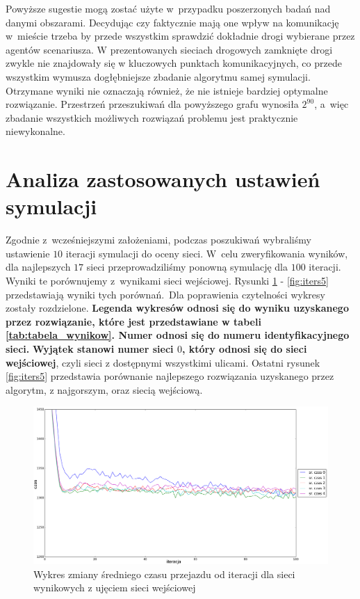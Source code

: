 \documentclass[twoside,12pt]{report}
\begin{document}
Powyższe sugestie mogą zostać użyte w~przypadku poszerzonych badań nad danymi obszarami. Decydując czy faktycznie mają one wpływ na komunikację w~mieście trzeba by przede wszystkim sprawdzić dokładnie drogi wybierane przez agentów scenariusza. W prezentowanych sieciach drogowych zamknięte drogi zwykle nie znajdowały się w kluczowych punktach komunikacyjnych, co przede wszystkim wymusza dogłębniejsze zbadanie algorytmu samej symulacji. Otrzymane wyniki nie oznaczają również, że nie istnieje bardziej optymalne rozwiązanie. Przestrzeń przeszukiwań dla powyższego grafu wynosiła $2^{90}$, a~więc zbadanie wszystkich możliwych rozwiązań problemu jest praktycznie niewykonalne.

\section{Analiza zastosowanych ustawień symulacji}

Zgodnie z~wcześniejszymi założeniami, podczas poszukiwań wybraliśmy ustawienie $10$ iteracji symulacji do oceny sieci. W~celu zweryfikowania wyników, dla najlepszych $17$ sieci przeprowadziliśmy ponowną symulację dla $100$ iteracji. Wyniki te porównujemy z~wynikami sieci wejściowej. Rysunki \ref{fig:iters1} - \ref{fig:iters5} przedstawiają wyniki tych porównań.~Dla poprawienia czytelności wykresy zostały rozdzielone. \textbf{Legenda wykresów odnosi się do wyniku uzyskanego przez rozwiązanie, które jest przedstawiane w tabeli \ref{tab:tabela_wynikow}. Numer odnosi się do numeru identyfikacyjnego sieci.} \textbf{Wyjątek stanowi numer sieci $0$, który odnosi się do sieci wejściowej}, czyli sieci z dostępnymi wszystkimi ulicami. Ostatni rysunek \ref{fig:iters5} przedstawia porównanie najlepszego rozwiązania uzyskanego przez algorytm, z najgorszym, oraz siecią wejściową.

\begin{figure}[htbp]
\centering
\includegraphics[width=1\textwidth]{img/iters/iters1}
\caption{Wykres zmiany średniego czasu przejazdu od iteracji dla sieci wynikowych z ujęciem sieci wejściowej}
\label{fig:iters1}
\end{figure}
\end{document}
